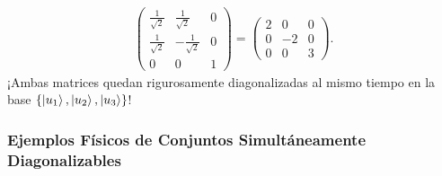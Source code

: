 \begin{ejemplobox}
\begin{align}
\begin{pmatrix}
            \frac{1}{\sqrt{2}} & \frac{1}{\sqrt{2}} & 0 \\
            \frac{1}{\sqrt{2}} & -\frac{1}{\sqrt{2}} & 0 \\
            0 & 0 & 1
        \end{pmatrix} = \begin{pmatrix} 2 & 0 & 0 \\ 0 & -2 & 0 \\ 0 & 0 & 3 \end{pmatrix}.
    \end{align}
    ¡Ambas matrices quedan rigurosamente diagonalizadas al mismo tiempo en la base $\{\left| u_1 \right\rangle, \left| u_2 \right\rangle, \left| u_3 \right\rangle\}$!
\end{ejemplobox}



\subsubsection{Ejemplos Físicos de Conjuntos Simultáneamente Diagonalizables}


